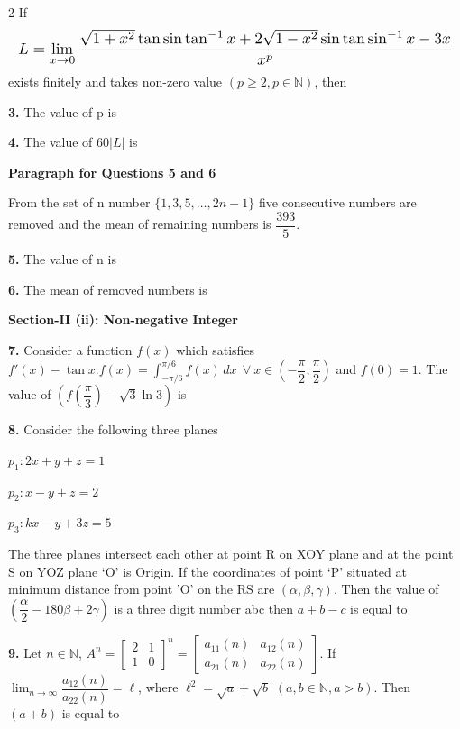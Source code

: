 \documentclass[10pt]{extarticle}
\newcommand{\subsectionhdr}[1]{\par\vspace{3pt}\noindent\textbf{#1}\par\vspace{2pt}}
\begin{document}
\begin{multicols}{2}
If
$$\resizebox{\linewidth}{!}{$L=\displaystyle\lim_{x\to0}\dfrac{\sqrt{1+x^2}\tan\sin\tan^{-1}x+2\sqrt{1-x^2}\sin\tan\sin^{-1}x-3x}{x^p}$}$$
exists finitely and takes non-zero value $(p\ge2,p\in\mathbb N)$, then

\textbf{3.} The value of p is

\textbf{4.} The value of $60|L|$ is

\textbf{Paragraph for Questions 5 and 6}

From the set of n number $\{1,3,5,\ldots,2n-1\}$ five consecutive numbers are removed and the mean of remaining numbers is $\dfrac{393}5$.

\textbf{5.} The value of n is

\textbf{6.} The mean of removed numbers is

\subsectionhdr{Section-II (ii): Non-negative Integer}

\textbf{7.} Consider a function $f(x)$ which satisfies $f'(x)-\tan x.f(x)=\displaystyle\int_{-\pi/6}^{\pi/6}f(x)\,dx\ \ \forall\ x\in\left(-\dfrac\pi2,\dfrac\pi2\right)$ and $f(0)=1$. The value of $\left(f\left(\dfrac\pi3\right)-\sqrt3\ln3\right)$ is

\textbf{8.} Consider the following three planes

$p_1: 2x+y+z=1$

$p_2: x-y+z=2$

$p_3: kx-y+3z=5$

The three planes intersect each other at point R on XOY plane and at the point S on YOZ plane `O' is Origin. If the coordinates of point `P' situated at minimum distance from point 'O' on the RS are $(\alpha,\beta,\gamma)$. Then the value of $\left(\dfrac\alpha2-180\beta+2\gamma\right)$ is a three digit number abc then $a+b-c$ is equal to

\textbf{9.} Let $n\in\mathbb N$, $A^n=\begin{bmatrix}2&1\\1&0\end{bmatrix}^n=\begin{bmatrix}a_{11}(n)&a_{12}(n)\\a_{21}(n)&a_{22}(n)\end{bmatrix}$. If $\displaystyle\lim_{n\to\infty}\dfrac{a_{12}(n)}{a_{22}(n)}=\ell$, where $\ell^2=\sqrt a+\sqrt b$ $(a,b\in\mathbb N,a>b)$. Then $(a+b)$ is equal to

\end{multicols}
\end{document}

